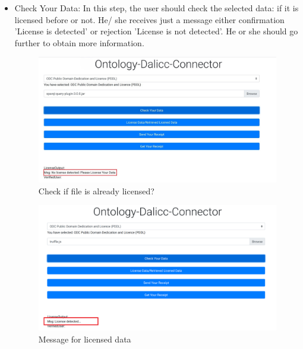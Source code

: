 \begin{itemize}
\begin{center}
\begin{figure}[htb!]
	\end{figure}
\end{center}
	\item Check Your Data:
	In this step, the user should check the selected data: if it is licensed before or not. He/ she receives just a message either confirmation 'License is detected' or rejection 'License is not detected'. He or she should go further to obtain more information.
    \begin{center}
	\begin{figure}[htb!]
		
		\begin{minipage}{0.45\linewidth}
			\centering
			\includegraphics[width=1.95\textwidth]{images/chap03_checkFile.jpg}
		\end{minipage}
		\caption[Check if file is already licensed?]{Check if file is already licensed?}
		
	\end{figure}
	
\end{center}

\begin{center}
	\begin{figure}[htb!]
		
		\begin{minipage}{0.45\linewidth}
			\centering
			\includegraphics[width=1.95\textwidth]{images/chap03_found_license.png}
		\end{minipage}
		\caption[Message for licensed data]{Message for licensed data}
		

\end{figure}
\end{center}
\end{itemize}
